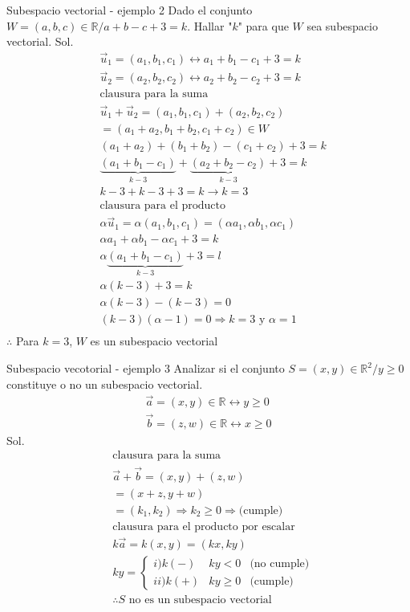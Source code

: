 \begin{Example*} {Subespacio vectorial - ejemplo 2}
	Dado el conjunto $W={(a,b,c)\in \mathbb{R}/a+b-c+3=k}$. Hallar "$k$" para que $W$ sea subespacio vectorial.
	Sol.
	\begin{align*}
		&\vec{u}_1=(a_1,b_1,c_1)\leftrightarrow a_1+b_1-c_1+3=k\\
		&\vec{u}_2=(a_2,b_2,c_2)\leftrightarrow a_2+b_2-c_2+3=k\\
		&\text{clausura para la suma}\\
		&\vec{u}_1+\vec{u}_2=(a_1,b_1,c_1)+(a_2,b_2,c_2)\\
		&=(a_1+a_2,b_1+b_2,c_1+c_2)\in W\\
		&(a_1+a_2)+(b_1+b_2)-(c_1+c_2)+3=k\\
		&\underbrace{(a_1+b_1-c_1)}_{k-3}+\underbrace{(a_2+b_2-c_2)}_{k-3}+3=k\\
		&k-3+k-3+3=k\rightarrow k=3\\
		&\text{clausura para el producto}\\
		&\alpha\vec{u}_1=\alpha(a_1,b_1,c_1)=(\alpha a_1,\alpha b_1, \alpha c_1)\\
		&\alpha a_1+\alpha b_1 - \alpha c_1+3=k\\
		&\alpha\underbrace{(a_1+b_1-c_1)}_{k-3}+3=l\\
		&\alpha(k-3)+3=k\\
		&\alpha(k-3)-(k-3)=0\\
		&(k-3)(\alpha-1)=0\Rightarrow k=3 \text{ y } \alpha=1\\	
	\end{align*}
	$\therefore$ Para $k=3$, $W$ es un subespacio vectorial
\end{Example*}
\begin{Example*} {Subespacio vecotorial - ejemplo 3}
	Analizar si el conjunto $S={(x,y)\in \mathbb{R}^2/y\ge 0}$ constituye o no un subespacio vectorial.
	\begin{gather*}
		\vec{a}=(x,y)\in\mathbb{R}\leftrightarrow y\ge0\\
		\vec{b}=(z,w)\in\mathbb{R}\leftrightarrow x\ge0
	\end{gather*}
	Sol.
	\begin{align*}
		&\text{clausura para la suma}\\
		&\vec{a}+\vec{b}=(x,y)+(z,w)\\
		&=(x+z,y+w)\\
		&=(k_1,k_2)\Rightarrow k_2\ge 0\Longrightarrow\text{(cumple)}\\
		&\text{clausura para el producto por escalar}\\
		&k\vec{a}=k(x,y)=(kx,ky)\\
		&ky=\left\{\begin{array}{llr}
			i) k (-) &  ky<0 & \text{(no cumple)}\\
			ii) k (+) & ky\ge 0 & \text{(cumple)}
		\end{array}\right.\\
		&\therefore S \text{ no es un subespacio vectorial}
	\end{align*}
\end{Example*}
